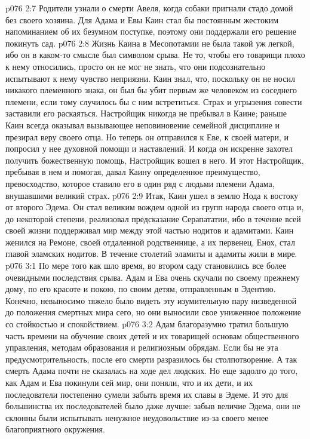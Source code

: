 \vs p076 2:7 \pc Родители узнали о смерти Авеля, когда собаки пригнали стадо домой без своего хозяина. Для Адама и Евы Каин стал бы постоянным жестоким напоминанием об их безумном поступке, поэтому они поддержали его решение покинуть сад.
\vs p076 2:8 Жизнь Каина в Месопотамии не была такой уж легкой, ибо он в каком\hyp{}то смысле был символом срыва. Не то, чтобы его товарищи плохо к нему относились, просто он не мог не знать, что они подсознательно испытывают к нему чувство неприязни. Каин знал, что, поскольку он не носил никакого племенного знака, он был бы убит первым же человеком из соседнего племени, если тому случилось бы с ним встретиться. Страх и угрызения совести заставили его раскаяться. Настройщик никогда не пребывал в Каине; раньше Каин всегда оказывал вызывающее неповиновение семейной дисциплине и презирал веру своего отца. Но теперь он отправился к Еве, к своей матери, и попросил у нее духовной помощи и наставлений. И когда он искренне захотел получить божественную помощь, Настройщик вошел в него. И этот Настройщик, пребывая в нем и помогая, давал Каину определенное преимущество, превосходство, которое ставило его в один ряд с людьми племени Адама, внушавшими великий страх.
\vs p076 2:9 Итак, Каин ушел в землю Нода к востоку от второго Эдема. Он стал великим вождем одной из групп народа своего отца и, до некоторой степени, реализовал предсказание Серапататии, ибо в течение всей своей жизни поддерживал мир между этой частью нодитов и адамитами. Каин женился на Ремоне, своей отдаленной родственнице, а их первенец, Енох, стал главой эламских нодитов. В течение столетий эламиты и адамиты жили в мире.
\vs p076 3:1 По мере того как шло время, во втором саду становились все более очевидными последствия срыва. Адам и Ева очень скучали по своему прежнему дому, по его красоте и покою, по своим детям, отправленным в Эдентию. Конечно, невыносимо тяжело было видеть эту изумительную пару низведенной до положения смертных мира сего, но они выносили свое униженное положение со стойкостью и спокойствием.
\vs p076 3:2 Адам благоразумно тратил большую часть времени на обучение своих детей и их товарищей основам общественного управления, методам образования и религиозным обрядам. Если бы не эта предусмотрительность, после его смерти разразилось бы столпотворение. А так смерть Адама почти не сказалась на ходе дел людских. Но еще задолго до того, как Адам и Ева покинули сей мир, они поняли, что и их дети, и их последователи постепенно сумели забыть время их славы в Эдеме. И это для большинства их последователей было даже лучше: забыв величие Эдема, они не склонны были испытывать ненужное неудовольствие из\hyp{}за своего менее благоприятного окружения.
